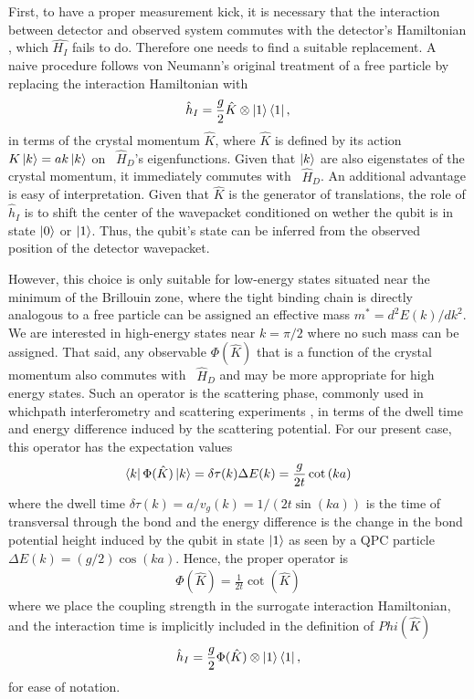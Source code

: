 \documentclass[10pt,
 amsmath,amssymb,
 aps,prb, twocolumn
]{revtex4-2}
\begin{document}
First, to have a proper measurement kick, it is necessary that the interaction between detector and observed system commutes with the detector's Hamiltonian \cite{vaartjesMaximizingNondemo2026}, which \mbox{$\hat{H_I}$} fails to do. Therefore one needs to find a suitable replacement. A naive procedure follows von Neumann's original treatment of a free particle by replacing the interaction Hamiltonian with 
\begin{align}
    \hat{h}_I = \frac{g}{2} \hat{K} \otimes \ket{1}\bra{1},
\end{align}
in terms of the crystal momentum $\hat{K}$, where $\hat{K}$ is defined by its action \mbox{$K\ket{k}=ak\ket{k}$} on \mbox{ $\hat{H}_D$}'s eigenfunctions. Given that \mbox{$\ket{k}$} are also eigenstates of the crystal momentum, it immediately commutes with \mbox{ $\hat{H}_D$}. An additional advantage is easy of interpretation. Given that $\hat{K}$ is the generator of translations, the role of \mbox{$\hat{h}_I$} is to shift the center of the wavepacket conditioned on wether the qubit is in state \mbox{$\ket{0}$} or \mbox{$\ket{1}$}. Thus, the qubit's state can be inferred from the observed position of the detector wavepacket. 

However, this choice is only suitable for low-energy states situated near the minimum of the Brillouin zone, where the tight binding chain is directly analogous to a free particle can be assigned an effective mass $m^{*}=d^2 E(k)/dk^2$. We are interested in high-energy states near $k=\pi/2$ where no such mass can be assigned. That said, any observable \mbox{$\Phi(\hat{K})$} that is a function of the crystal momentum also commutes with \mbox{ $\hat{H}_D$} and may be more appropriate for high energy states. Such an operator is the scattering phase, commonly used in whichpath interferometry and scattering experiments \cite{buttikerTunnelingTime1982, aleinerOrthogonalityCatastrophe1997,smithLifetimeCollision1960}, in terms of the dwell time and energy difference induced by the scattering potential. For our present case, this operator has the expectation values 
\begin{align}
    \bra{k} \Phi(\hat{K})\ket{k} = \delta\tau(k)\Delta E(k) = \frac{g}{2t}\cot{(ka)}
\end{align}
where the dwell time \mbox{$\delta\tau(k)=a/v_g(k) = 1/(2t\sin{(ka)})$} is the time of transversal through the bond and the energy difference is the change in the bond potential height induced by the qubit in state \mbox{$\ket{1}$} as seen by a QPC particle $\Delta E(k) = (g/2) \cos(k a)$. Hence, the proper operator is
\begin{align}\label{eq:phase_operator}
    \Phi(\hat{K}) = \frac{1}{2t}\cot{(\hat{K})}
\end{align}
where we place the coupling strength in the surrogate interaction Hamiltonian, and the interaction time is implicitly included in the definition of \mbox{$Phi(\hat{K})$}
\begin{align}
    \hat{h}_I = \frac{g}{2}  \Phi(\hat{K}) \otimes \ket{1}\bra{1},
\end{align}
for ease of notation. 
\end{document}
